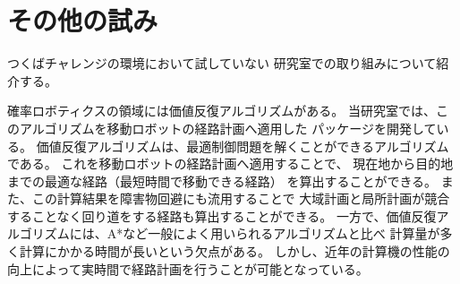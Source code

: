 \documentclass[twocolumn,9pt]{jsproceedings}
\begin{document}



\section{その他の試み}

つくばチャレンジの環境において試していない
研究室での取り組みについて紹介する。

確率ロボティクスの領域には価値反復アルゴリズム\cite{詳解}\cite{青い本}がある。
当研究室では、このアルゴリズムを移動ロボットの経路計画へ適用した
パッケージを開発している\cite{ueda2023JRM}。
価値反復アルゴリズムは、最適制御問題を解くことができるアルゴリズムである。
これを移動ロボットの経路計画へ適用することで、
現在地から目的地までの最適な経路（最短時間で移動できる経路）
を算出することができる。
また、この計算結果を障害物回避にも流用することで
大域計画と局所計画が競合することなく回り道をする経路も算出することができる。
一方で、価値反復アルゴリズムには、A*など一般によく用いられるアルゴリズムと比べ
計算量が多く計算にかかる時間が長いという欠点がある。
しかし、近年の計算機の性能の向上によって実時間で経路計画を行うことが可能となっている。
\end{document}
